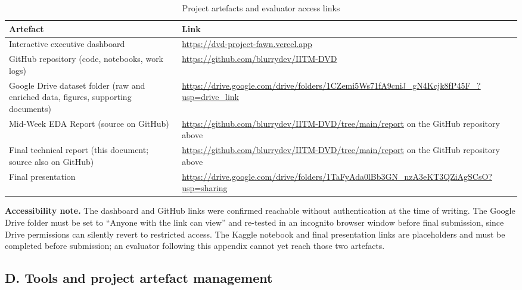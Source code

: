 \documentclass[11pt,a4paper]{article}
\begin{document}
\begin{table}[h]
\centering
\caption{Project artefacts and evaluator access links}
\begin{tabularx}{\textwidth}{L{3.6cm} L{9.9cm}}
\toprule
\textbf{Artefact} & \textbf{Link} \\
\midrule
Interactive executive dashboard &
\url{https://dvd-project-fawn.vercel.app} \\[4pt]
GitHub repository (code, notebooks, work logs) &
\url{https://github.com/blurrydev/IITM-DVD} \\[4pt]
Google Drive dataset folder (raw and enriched data, figures, supporting documents) &
\url{https://drive.google.com/drive/folders/1CZemi5Ws71fA9cniJ_gN4Kcjk8fP45F_?usp=drive_link} \\[4pt]
Mid-Week EDA Report (source on GitHub) &
\url{https://github.com/blurrydev/IITM-DVD/tree/main/report} on the GitHub repository above \\[4pt]
Final technical report (this document; source also on GitHub) &
\url{https://github.com/blurrydev/IITM-DVD/tree/main/report} on the GitHub repository above \\[4pt]
Final presentation &
\url{https://drive.google.com/drive/folders/1TaFyAda0lBb3GN_nzA3eKT3QZiAgSCsO?usp=sharing} \\
\bottomrule
\end{tabularx}
\end{table}

\textbf{Accessibility note.} The dashboard and GitHub links were confirmed reachable without authentication at the time of writing. The Google Drive folder must be set to ``Anyone with the link can view'' and re-tested in an incognito browser window before final submission, since Drive permissions can silently revert to restricted access. The Kaggle notebook and final presentation links are placeholders and must be completed before submission; an evaluator following this appendix cannot yet reach those two artefacts.

\subsection*{D. Tools and project artefact management}
\end{document}
